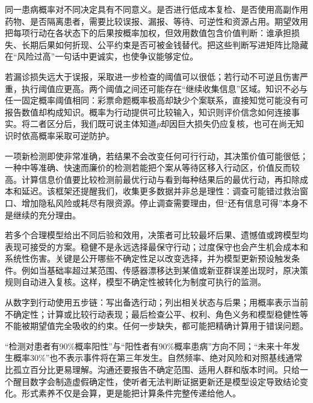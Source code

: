 同一患病概率对不同决定具有不同意义。是否进行低成本复检、是否使用高副作用药物、是否隔离患者，需要比较误报、漏报、等待、可逆性和资源占用。期望效用把每项行动在各状态下的后果按概率加权，但效用数值包含价值判断：谁承担损失、长期后果如何折现、公平约束是否可被金钱替代。把这些判断写进矩阵比隐藏在“风险过高”一句话中更诚实，也使争议能够定位。

若漏诊损失远大于误报，采取进一步检查的阈值可以很低；若行动不可逆且伤害严重，执行阈值应更高。两个阈值之间还可能存在“继续收集信息”区域。知识不必与任一固定概率阈值相同：彩票命题概率极高却缺少个案联系，直接知觉可能没有可报告数值却构成知识。概率为行动提供可比较输入，知识则评价信念如何连接事实。将二者区分后，我们既可说主体知道$p$却因巨大损失仍应复核，也可在尚无知识时依高概率采取可逆防护。

一项新检测即使非常准确，若结果不会改变任何可行行动，其决策价值可能很低；一种中等准确、快速而廉价的检测若能把个案从等待区移入行动区，价值反而较高。计算信息价值要比较检测前最优行动与看到每种结果后的最优行动，再扣除成本和延迟。该框架还提醒我们，收集更多数据并非总是理性：调查可能错过救治窗口、增加隐私风险或耗尽有限资源。停止调查需要理由，但“还有信息可得”本身不是继续的充分理由。

若多个合理模型给出不同后验和效用，决策者可比较最坏后果、遗憾值或跨模型均表现可接受的方案。稳健不是永远选择最保守行动；过度保守也会产生机会成本和系统性伤害。关键是公开哪些不确定性足以改变选择，并为模型更新预设触发条件。例如当基础率超过某范围、传感器漂移达到某值或新亚群误差出现时，原决策规则自动进入复核。这样，模型不确定性被转化为制度可执行的监测。

\begin{argumentbox}
从数字到行动使用五步链：写出备选行动；列出相关状态与后果；用概率表示当前不确定性；计算或比较行动表现；最后检查公平、权利、角色义务和模型稳健性等不能被期望值完全吸收的约束。任何一步缺失，都可能把精确计算用于错误问题。
\end{argumentbox}

“检测对患者有90\%概率阳性”与“阳性者有90\%概率患病”方向不同；“未来十年发生概率30\%”也不表示事件将在第三年发生。自然频率、绝对风险和对照基线通常比孤立百分比更易理解。沟通还要报告不确定范围、适用人群和版本时间。只给一个醒目数字会制造虚假确定性，使听者无法判断证据更新还是模型设定导致结论变化。形式素养不仅是会算，更是能把计算条件完整传递给他人。


